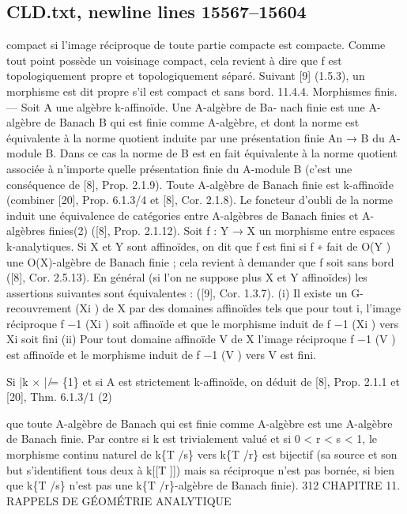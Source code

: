 \documentclass[
  10pt,
]{article}
\newenvironment{Shaded}{}{}
\newcommand{\NormalTok}[1]{#1}
\begin{document}
\subsection{CLD.txt, newline lines
15567--15604}\label{cld.txt-newline-lines-1556715604}

\begin{Shaded}
\begin{Highlighting}[]
\NormalTok{compact si l’image réciproque de toute partie compacte est compacte. Comme tout point}
\NormalTok{possède un voisinage compact, cela revient à dire que f est topologiquement propre et}
\NormalTok{topologiquement séparé.}
\NormalTok{  Suivant [9] (1.5.3), un morphisme est dit propre s’il est compact et sans bord.}
\NormalTok{11.4.4. Morphismes finis. — Soit A une algèbre k{-}affinoïde. Une A{-}algèbre de Ba{-}}
\NormalTok{nach finie est une A{-}algèbre de Banach B qui est finie comme A{-}algèbre, et dont la}
\NormalTok{norme est équivalente à la norme quotient induite par une présentation finie An → B}
\NormalTok{du A{-}module B. Dans ce cas la norme de B est en fait équivalente à la norme quotient}
\NormalTok{associée à n’importe quelle présentation finie du A{-}module B (c’est une conséquence de}
\NormalTok{[8], Prop. 2.1.9). Toute A{-}algèbre de Banach finie est k{-}affinoïde (combiner [20], Prop.}
\NormalTok{6.1.3/4 et [8], Cor. 2.1.8). Le foncteur d’oubli de la norme induit une équivalence de}
\NormalTok{catégories entre A{-}algèbres de Banach finies et A{-}algèbres finies(2) ([8], Prop. 2.1.12).}
\NormalTok{   Soit f : Y → X un morphisme entre espaces k{-}analytiques. Si X et Y sont affinoïdes,}
\NormalTok{on dit que f est fini si f ∗ fait de O(Y ) une O(X){-}algèbre de Banach finie ; cela revient}
\NormalTok{à demander que f soit sans bord ([8], Cor. 2.5.13). En général (si l’on ne suppose plus}
\NormalTok{X et Y affinoïdes) les assertions suivantes sont équivalentes : ([9], Cor. 1.3.7).}
\NormalTok{  (i) Il existe un G{-}recouvrement (Xi ) de X par des domaines affinoïdes tels que pour}
\NormalTok{tout i, l’image réciproque f −1 (Xi ) soit affinoïde et que le morphisme induit de f −1 (Xi )}
\NormalTok{vers Xi soit fini}
\NormalTok{  (ii) Pour tout domaine affinoïde V de X l’image réciproque f −1 (V ) est affinoïde et le}
\NormalTok{morphisme induit de f −1 (V ) vers V est fini.}

\NormalTok{  Si |k × | ̸= \{1\} et si A est strictement k{-}affinoïde, on déduit de [8], Prop. 2.1.1 et [20], Thm. 6.1.3/1}
\NormalTok{(2)}

\NormalTok{que toute A{-}algèbre de Banach qui est finie comme A{-}algèbre est une A{-}algèbre de Banach finie. Par}
\NormalTok{contre si k est trivialement valué et si 0 \textless{} r \textless{} s \textless{} 1, le morphisme continu naturel de k\{T /s\} vers}
\NormalTok{k\{T /r\} est bijectif (sa source et son but s’identifient tous deux à k[[T ]]) mais sa réciproque n’est pas}
\NormalTok{bornée, si bien que k\{T /s\} n’est pas une k\{T /r\}{-}algèbre de Banach finie).}
\NormalTok{312                CHAPITRE 11. RAPPELS DE GÉOMÉTRIE ANALYTIQUE}


\end{Highlighting}
\end{Shaded}
\end{document}
